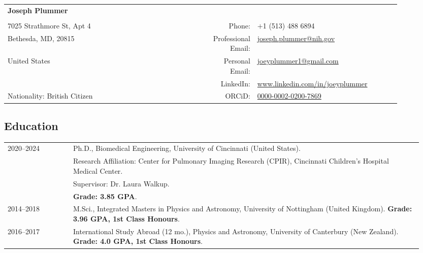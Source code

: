 \documentclass[12pt,]{scrartcl}
\date{}
\begin{document}
\begin{table}[h]
{\def\arraystretch{1.2}\tabcolsep=0pt
\begin{tabular}{p{0.50\linewidth}p{0.05\linewidth}p{0.35\linewidth}}

  \multirow{1}{*}{\LARGE \textbf{Joseph Plummer}} &  &  \\
  
  & & \\
  
  7025 Strathmore St, Apt 4 & \multicolumn{1}{r}{Phone:\;\;} & \multicolumn{1}{l}{$+$1 (513) 488 6894} \\
  
  Bethesda, MD, 20815 & \multicolumn{1}{r}{Professional Email:\;\;} &\multicolumn{1}{l}{\href{joseph.plummer@nih.gov}{joseph.plummer@nih.gov}} \\
  
  United States & \multicolumn{1}{r}{Personal Email:\;\;} &\multicolumn{1}{l}{\href{joeyplummer1@gmail.com}{joeyplummer1@gmail.com}} \\
  
   & \multicolumn{1}{r}{LinkedIn:\;\;} & \multicolumn{1}{l}{\url{www.linkedin.com/in/joeyplummer}} \\
  
  Nationality: British Citizen%
  & \multicolumn{1}{r}{ORCiD:\;\;} & \multicolumn{1}{l}{\href{https://orcid.org/0000-0002-0200-7869}{0000-0002-0200-7869}} 

\end{tabular}%
}
\end{table}
\subsection{Education}\label{education}


\begin{table}[h]
{\def\arraystretch{1.5}\tabcolsep=0pt
\begin{tabular}{p{0.15\linewidth}p{0.8\linewidth}}

  \multirow{2}{*}[0.85em]{2020--2024} & Ph.D., Biomedical Engineering, University of Cincinnati (United States). \\
  
  & Research Affiliation: Center for Pulmonary Imaging Research (CPIR), Cincinnati Children's Hospital Medical Center. \\
  & Supervisor: Dr. Laura Walkup. \\ & \textbf{Grade: 3.85 GPA}.\\
  
  2014--2018 & M.Sci., Integrated Masters in Physics and Astronomy, University of Nottingham (United Kingdom). \textbf{Grade: 3.96 GPA, 1st Class Honours}. \\

  2016--2017 & International Study Abroad (12 mo.), Physics and Astronomy, University of Canterbury (New Zealand). \textbf{Grade: 4.0 GPA, 1st Class Honours}. 
\end{tabular}%
}
\end{table}
\end{document}
